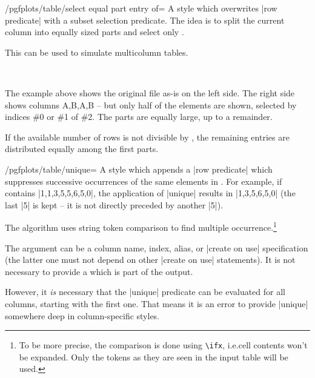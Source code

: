 \documentclass[a4paper]{ltxdoc}
\begin{document}
\begin{stylekey}{/pgfplots/table/select equal part entry of=}
    A style which overwrites |row predicate| with a subset selection predicate.
    The idea is to split the current column into  equally
    sized parts and select only .

    This can be used to simulate multicolumn tables.
\begin{codeexample}[]

%
~
\end{codeexample}
    The example above shows the original file as-is on the left side. The right
    side shows columns A,B,A,B -- but only half of the elements are shown,
    selected by indices \#0 or \#1 of \#2. The parts are equally large, up to a
    remainder.

    If the available number of rows is not divisible by , the
    remaining entries are distributed equally among the first parts.
\end{stylekey}

\begin{stylekey}{/pgfplots/table/unique=}
    A style which appends a |row predicate| which suppresses successive
    occurrences of the same elements in . For example, if
     contains |1,1,3,5,5,6,5,0|, the application of |unique|
    results in |1,3,5,6,5,0| (the last |5| is kept -- it is not directly
    preceded by another |5|).

    The algorithm uses string token comparison to find multiple
    occurrence.\footnote{To be more precise, the comparison is done using
    \texttt{\textbackslash ifx}, i.e.\@ cell contents won't be expanded. Only
    the tokens as they are seen in the input table will be used.}

    The argument  can be a column name, index, alias, or
    |create on use| specification (the latter one must not depend on other
    |create on use| statements). It is not necessary to provide a  which is part of the output.

    However, it \emph{is} necessary that the |unique| predicate can be
    evaluated for all columns, starting with the first one. That means it is an
    error to provide |unique| somewhere deep in column-specific styles.
\end{stylekey}
\end{document}
